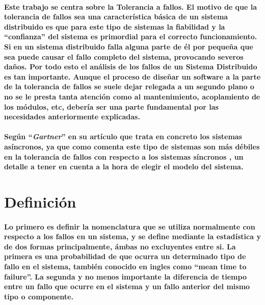 \documentclass{./llncs2e/llncs}
\begin{document}
\paragraph{
Este trabajo se centra sobre la \textbf{Tolerancia a fallos}. El motivo de que la
tolerancia de fallos sea una característica b\'{a}sica de un sistema distribuido es que
para este tipo de sistemas la fiabilidad y la ``confianza'' del sistema es primordial 
para el correcto funcionamiento. Si en un sistema distribuido falla alguna parte de \'{e}l
por pequeña que sea puede causar el fallo completo del sistema, provocando severos
daños. Por todo esto el an\'{a}lisis de los fallos de un Sistema Distribuido es tan importante. Aunque el proceso de diseñar un software a la parte de la tolerancia de fallos se suele dejar relegada a un segundo plano o no se le presta tanta atenci\'{o}n como al mantenimiento, acoplamiento de los m\'{o}dulos, etc, debería ser una parte fundamental por las necesidades anteriormente explicadas. 
}

\paragraph{
Seg\'{u}n ``\textit{Gartner}'' en su art\'{i}culo que trata en concreto los sistemas as\'{i}ncronos, ya que como comenta este tipo de sistemas son m\'{a}s d\'{e}biles en la tolerancia de fallos con respecto a los sistemas s\'{i}ncronos , un detalle a tener en cuenta a la hora 
de elegir el modelo del sistema.
}
\newpage
\section{Definici\'{o}n}
\paragraph{
Lo primero es definir la nomenclatura que se utiliza normalmente con respecto a los fallos en un sistema, y se define mediante la estad\'{i}stica y de dos formas principalmente, \'{a}mbas no excluyentes entre si. La primera es una probabilidad de que ocurra un determinado tipo de fallo en el sistema, tambi\'{e}n conocido en ingles como ``mean time to failure''. La segunda y no menos importante la diferencia de tiempo entre un fallo que ocurre en el sistema y  un fallo anterior del mismo tipo o componente.
}
\end{document}
